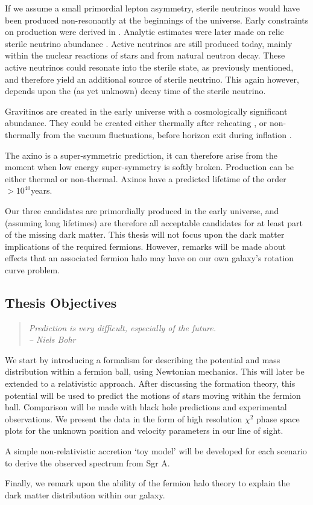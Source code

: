 If we assume a small primordial lepton asymmetry, sterile neutrinos would have been produced non-resonantly at the beginnings of the
universe. Early constraints on production were derived in \cite{ref_sterileneutrinoconstraint1, ref_sterileneutrinoconstraint2}. Analytic
estimates were later made on relic sterile neutrino abundance \cite{ref_sterileneutrinoanalytic}. Active
neutrinos are still produced today, mainly within the nuclear reactions of stars and from natural neutron decay. These active neutrinos
could resonate into the sterile state, as previously mentioned, and therefore yield an additional source of sterile neutrino. This
again however, depends upon the (as yet unknown) decay time of the sterile neutrino.

Gravitinos are created in the early universe with a cosmologically significant abundance. They could be created either thermally after
reheating \cite{ref_gravitinothermal}, or non-thermally from the vacuum fluctuations, before horizon exit during inflation
\cite{ref_gravitinononthermal}.

The axino is a super-symmetric prediction, it can therefore arise from the moment when low energy super-symmetry is softly
broken. Production can be either thermal or non-thermal. Axinos have a predicted lifetime of the order $>10^{40}$years.

Our three candidates are primordially produced in the early universe, and (assuming long lifetimes) are therefore all
acceptable candidates for at least part of the missing dark matter. This thesis will not focus upon the dark matter
implications of the required fermions. However, remarks will be made about effects that an associated fermion halo may have on our
own galaxy's rotation curve problem.

\subsection{Thesis Objectives}
\begin{quotation}
	\raggedleft \it
	Prediction is very difficult, especially of the future.\\
	-- Niels Bohr
\end{quotation}
We start by introducing a formalism for describing the potential and mass distribution within a fermion ball, using Newtonian mechanics.
This will later be extended to a relativistic approach. After discussing the formation theory, this potential will be used to
predict the motions of stars moving within the fermion ball. Comparison will be made with black hole predictions and experimental
observations. We present the data in the form of high resolution $\chi^2$ phase space plots for the unknown position and velocity parameters
in our line of sight.

A simple non-relativistic accretion `toy model' will be developed for each scenario to derive the observed spectrum from Sgr A.

Finally, we remark upon the ability of the fermion halo theory to explain the dark matter distribution within our galaxy.
